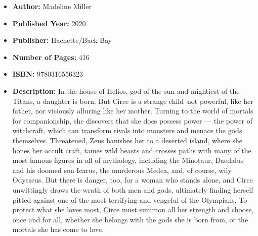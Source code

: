 \documentclass{tufte-handout}
\begin{document}
\begin{itemize}
    \item[] \textbf{Author:} Madeline Miller 
    \item[] \textbf{Published Year:} 2020
    \item[] \textbf{Publisher:} Hachette/Back Bay
    \item[] \textbf{Number of Pages:} 416     
    \item[] \textbf{ISBN:} 9780316556323
    \item[] \textbf{Description:} In the house of Helios, god of the sun and mightiest of the Titans, a daughter is born. But Circe is a strange child--not powerful, like her father, nor viciously alluring like her mother. Turning to the world of mortals for companionship, she discovers that she does possess power --- the power of witchcraft, which can transform rivals into monsters and menace the gods themselves. Threatened, Zeus banishes her to a deserted island, where she hones her occult craft, tames wild beasts and crosses paths with many of the most famous figures in all of mythology, including the Minotaur, Daedalus and his doomed son Icarus, the murderous Medea, and, of course, wily Odysseus. But there is danger, too, for a woman who stands alone, and Circe unwittingly draws the wrath of both men and gods, ultimately finding herself pitted against one of the most terrifying and vengeful of the Olympians. To protect what she loves most, Circe must summon all her strength and choose, once and for all, whether she belongs with the gods she is born from, or the mortals she has come to love.
\end{itemize}
\end{document}
